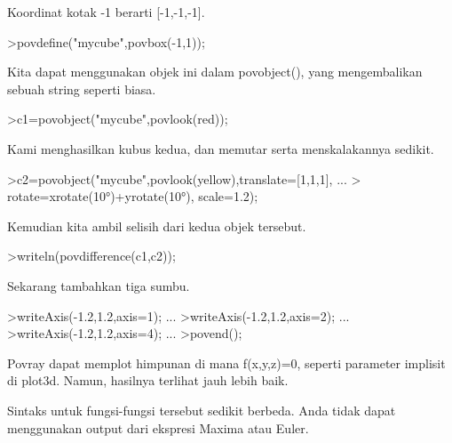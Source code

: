 \documentclass[a4paper,10pt]{article}
\begin{document}
\begin{eulernotebook}
\begin{eulercomment}
\begin{eulercomment}
\begin{eulercomment}
\begin{eulercomment}
\begin{eulercomment}
\begin{eulercomment}
\begin{eulercomment}
\begin{eulercomment}
\begin{eulercomment}
\begin{eulercomment}
\begin{eulercomment}
\begin{eulercomment}
\begin{eulercomment}
\begin{eulercomment}
\begin{eulercomment}
\begin{eulercomment}
\begin{eulercomment}
Koordinat kotak -1 berarti [-1,-1,-1].
\end{eulercomment}
\begin{eulerprompt}
>povdefine("mycube",povbox(-1,1));
\end{eulerprompt}
\begin{eulercomment}
Kita dapat menggunakan objek ini dalam povobject(), yang mengembalikan
sebuah string seperti biasa.
\end{eulercomment}
\begin{eulerprompt}
>c1=povobject("mycube",povlook(red));
\end{eulerprompt}
\begin{eulercomment}
Kami menghasilkan kubus kedua, dan memutar serta menskalakannya
sedikit.
\end{eulercomment}
\begin{eulerprompt}
>c2=povobject("mycube",povlook(yellow),translate=[1,1,1], ...
>  rotate=xrotate(10°)+yrotate(10°), scale=1.2);
\end{eulerprompt}
\begin{eulercomment}
Kemudian kita ambil selisih dari kedua objek tersebut.
\end{eulercomment}
\begin{eulerprompt}
>writeln(povdifference(c1,c2));
\end{eulerprompt}
\begin{eulercomment}
Sekarang tambahkan tiga sumbu.
\end{eulercomment}
\begin{eulerprompt}
>writeAxis(-1.2,1.2,axis=1); ...
>writeAxis(-1.2,1.2,axis=2); ...
>writeAxis(-1.2,1.2,axis=4); ...
>povend();
\end{eulerprompt}
\begin{eulercomment}
Povray dapat memplot himpunan di mana f(x,y,z)=0, seperti parameter
implisit di plot3d. Namun, hasilnya terlihat jauh lebih baik.

Sintaks untuk fungsi-fungsi tersebut sedikit berbeda. Anda tidak dapat
menggunakan output dari ekspresi Maxima atau Euler.


\end{eulercomment}
\end{eulercomment}
\end{eulercomment}
\end{eulercomment}
\end{eulercomment}
\end{eulercomment}
\end{eulercomment}
\end{eulercomment}
\end{eulercomment}
\end{eulercomment}
\end{eulercomment}
\end{eulercomment}
\end{eulercomment}
\end{eulercomment}
\end{eulercomment}
\end{eulercomment}
\end{eulercomment}
\end{eulernotebook}
\end{document}
